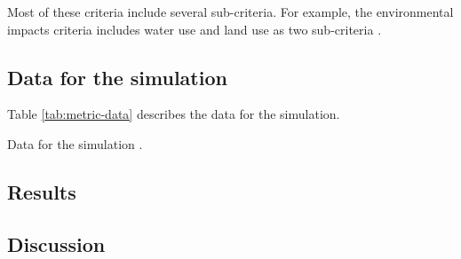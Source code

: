 Most of these criteria include several sub-criteria. For example, the environmental impacts criteria 
includes water use and land use as two sub-criteria \cite{wigeland_nuclear_2014-1}.

\subsection{Data for the simulation}

Table \ref{tab:metric-data} describes the data for the simulation.

\begin{sidewaystable}[ht!]
    \centering
    \caption{Data for the simulation \cite{wigeland_nuclear_2014-1}.}
    \label{tab:metric-data}
    \resizebox*{\textwidth}{!}{}
\end{sidewaystable}

\subsection{Results}

\subsection{Discussion}






